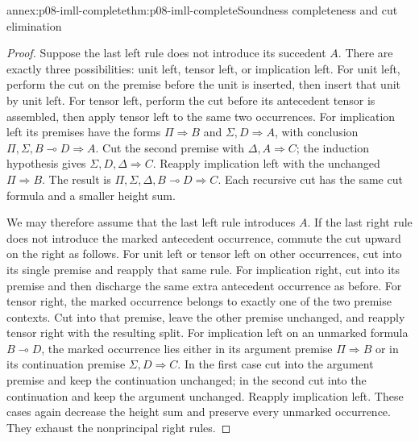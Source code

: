 \begin{annexitem}{annex:p08-imll-complete}{thm:p08-imll-complete}{Soundness completeness and cut elimination}
\begin{proof}
Suppose the last left rule does not introduce its succedent \(A\).
There are exactly three possibilities: unit left, tensor left, or
implication left. For unit left, perform the cut on the premise
before the unit is inserted, then insert that unit by unit left.
For tensor left, perform the cut before its antecedent tensor is
assembled, then apply tensor left to the same two occurrences.
For implication left its premises have the forms
\(\Pi\Rightarrow B\) and \(\Sigma,D\Rightarrow A\), with conclusion
\(\Pi,\Sigma,B\multimap D\Rightarrow A\).
Cut the second premise with \(\Delta,A\Rightarrow C\);
the induction hypothesis gives
\(\Sigma,D,\Delta\Rightarrow C\).
Reapply implication left with the unchanged
\(\Pi\Rightarrow B\). The result is
\(\Pi,\Sigma,\Delta,B\multimap D\Rightarrow C\).
Each recursive cut has the same cut formula and a smaller height sum.

We may therefore assume that the last left rule introduces \(A\).
If the last right rule does not introduce the marked antecedent
occurrence, commute the cut upward on the right as follows.
For unit left or tensor left on other occurrences, cut into its
single premise and reapply that same rule.
For implication right, cut into its premise and then discharge the
same extra antecedent occurrence as before.
For tensor right, the marked occurrence belongs to exactly one
of the two premise contexts. Cut into that premise, leave the other
premise unchanged, and reapply tensor right with the resulting split.
For implication left on an unmarked formula \(B\multimap D\),
the marked occurrence lies either in its argument premise
\(\Pi\Rightarrow B\) or in its continuation premise
\(\Sigma,D\Rightarrow C\).
In the first case cut into the argument premise and keep the
continuation unchanged; in the second cut into the continuation
and keep the argument unchanged. Reapply implication left.
These cases again decrease the height sum and preserve every
unmarked occurrence. They exhaust the nonprincipal right rules.


\end{proof}
\end{annexitem}

